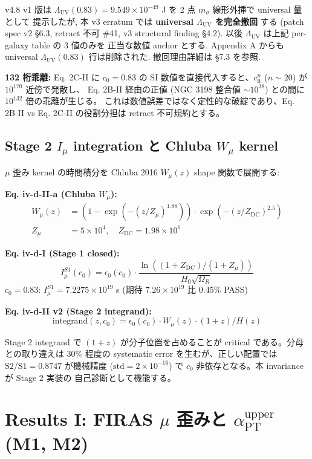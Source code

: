 \documentclass[11pt,a4paper]{ltjsarticle}
\newcommand{\epso}{\epsilon_0}
\newcommand{\aPT}{\alpha_{\mathrm{PT}}}
\newcommand{\Imu}{I_{\mu}}
\newcommand{\Wmu}{W_{\mu}}
\newcommand{\Lambdauv}{\Lambda_{\mathrm{UV}}}
\newcommand{\ZMU}{Z_{\mu}}
\newcommand{\ZDC}{Z_{\mathrm{DC}}}
\newcommand{\msigma}{m_{\sigma}}
\newcommand{\clt}{c_{\mathrm{lt}}}       %
\begin{document}
v4.8 v1 版は $\Lambdauv(0.83) = 9.549 \times 10^{-49}$ J を 2 点 $\msigma$ 線形外挿で universal 量として
提示したが, 本 v3 erratum では \textbf{universal $\Lambdauv$ を完全撤回} する (patch spec v2 \S 6.3,
retract 不可 \#41, v3 structural finding §4.2). 以後 $\Lambdauv$ は上記 per-galaxy table の 3 値のみを
正当な数値 anchor とする. Appendix A からも universal $\Lambdauv(0.83)$ 行は削除された. 撤回理由詳細は \S 7.3 を参照.

\medskip\noindent
\textbf{132 桁乖離:}
Eq. 2C-II に $c_0 = 0.83$ の SI 数値を直接代入すると、$\clt^{n}$ ($n \sim 20$) が $10^{170}$ 近傍で発散し、
Eq. 2B-II 経由の正値 (NGC 3198 整合値 $\sim 10^{38}$) との間に $10^{132}$ 倍の乖離が生じる。
これは数値誤差ではなく定性的な破綻であり、Eq. 2B-II vs Eq. 2C-II の役割分担は retract 不可規約とする。

\subsection{Stage 2 $\Imu$ integration と Chluba $\Wmu$ kernel}
$\mu$ 歪み kernel の時間積分を Chluba 2016 $\Wmu(z)$ shape 関数で展開する:

\begin{keybox}
\textbf{Eq. iv-d-II-a (Chluba $\Wmu$):}
\begin{align*}
\Wmu(z) &= \left(1 - \exp\left(-\left(z/\ZMU\right)^{1.88}\right)\right) \cdot \exp\left(-\left(z/\ZDC\right)^{2.5}\right) \\
\ZMU &= 5 \times 10^{4},\quad \ZDC = 1.98 \times 10^{6}
\end{align*}

\textbf{Eq. iv-d-I (Stage 1 closed):}
\[
\Imu^{S1}(c_0) = \epso(c_0) \cdot \frac{\ln((1+\ZDC)/(1+\ZMU))}{H_0 \sqrt{\Omega_R}}
\]
$c_0 = 0.83$: $\Imu^{S1} = 7.2275 \times 10^{19}$ s (期待 $7.26 \times 10^{19}$ 比 0.45\% PASS)

\textbf{Eq. iv-d-II v2 (Stage 2 integrand):}
\[
\text{integrand}(z, c_0) = \epso(c_0) \cdot \Wmu(z) \cdot (1+z) / H(z)
\]
\end{keybox}

Stage 2 integrand で $(1+z)$ が分子位置を占めることが critical である。分母との取り違えは 30\% 程度の
systematic error を生むが、正しい配置では $\mathrm{S2/S1} = 0.8747$ が機械精度
($\mathrm{std} = 2 \times 10^{-16}$) で $c_0$ 非依存となる。本 invariance が Stage 2 実装の
自己診断として機能する。

\section{Results I: FIRAS $\mu$ 歪みと $\aPT^{\mathrm{upper}}$ (M1, M2)}
\end{document}
